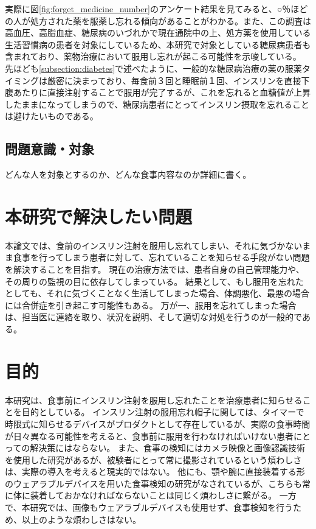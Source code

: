 実際に図\ref{fig:forget_medicine_number}のアンケート結果を見てみると、○％ほどの人が処方された薬を服薬し忘れる傾向があることがわかる。また、この調査は高血圧、高脂血症、糖尿病のいづれかで現在通院中の上、処方薬を使用している生活習慣病の患者を対象にしている\cite{drug_treatment_investigation}ため、本研究で対象としている糖尿病患者も含まれており、薬物治療において服用し忘れが起こる可能性を示唆している。
先ほども\ref{subsection:diabetes}で述べたように、一般的な糖尿病治療の薬の服薬タイミングは厳密に決まっており、毎食前３回と睡眠前１回、インスリンを直接下腹あたりに直接注射することで服用が完了するが、これを忘れると血糖値が上昇したままになってしまうので、糖尿病患者にとってインスリン摂取を忘れることは避けたいものである。

\subsection{問題意識・対象}

どんな人を対象とするのか、どんな食事内容なのか詳細に書く。

\section{本研究で解決したい問題}
\label{section:problem}

本論文では、食前のインスリン注射を服用し忘れてしまい、それに気づかないまま食事を行ってしまう患者に対して、忘れていることを知らせる手段がない問題を解決することを目指す。
現在の治療方法では、患者自身の自己管理能力や、その周りの監視の目に依存してしまっている。
結果として、もし服用を忘れたとしても、それに気づくことなく生活してしまった場合、体調悪化、最悪の場合には合併症を引き起こす可能性もある。
万が一、服用を忘れてしまった場合は、担当医に連絡を取り、状況を説明、そして適切な対処を行うのが一般的である。

\section{目的}
\label{section:purpose}

本研究は、食事前にインスリン注射を服用し忘れたことを治療患者に知らせることを目的としている。
インスリン注射の服用忘れ帽子に関しては、タイマーで時限式に知らせるデバイスがプロダクトとして存在しているが、実際の食事時間が日々異なる可能性を考えると、食事前に服用を行わなければいけない患者にとっての解決策にはならない。
また、食事の検知にはカメラ映像と画像認識技術を使用した研究があるが、被験者にとって常に撮影されているという煩わしさは、実際の導入を考えると現実的ではない。
他にも、顎や腕に直接装着する形のウェアラブルデバイスを用いた食事検知の研究がなされているが、こちらも常に体に装着しておかなければならないことは同じく煩わしさに繋がる。
一方で、本研究では、画像もウェアラブルデバイスも使用せず、食事検知を行うため、以上のような煩わしさはない。

